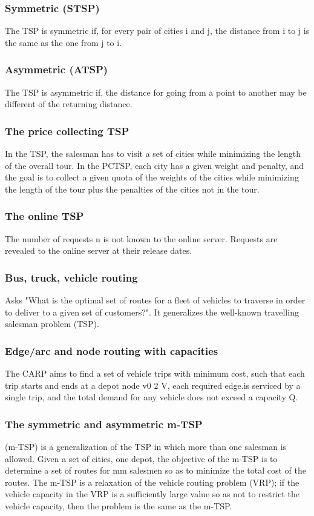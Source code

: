 \documentclass[12pt]{article}
\begin{document}
\subsubsection{ Symmetric (STSP) }
The TSP is symmetric if, for every pair of cities i and j, the distance from i to j is the same as the one from j to i.

\subsubsection{ Asymmetric (ATSP) }
The TSP is asymmetric if, the distance for going from a point to another may be different of the returning distance.

\subsubsection{ The price collecting TSP }
In the TSP, the salesman has to visit a set of cities while minimizing the length of the overall tour. In the PCTSP, each city has a given weight and penalty, and the goal is to collect a given quota of the weights of the cities while minimizing the length of the tour plus the penalties of the cities not in the tour.

\subsubsection{ The online TSP }
The number of requests n is not known to the online server. Requests are revealed to the online server at their release dates.

\subsubsection{ Bus, truck, vehicle routing }
Asks "What is the optimal set of routes for a fleet of vehicles to traverse in order to deliver to a given set of customers?". It generalizes the well-known travelling salesman problem (TSP).

\subsubsection{ Edge/arc and node routing with capacities }
The CARP aims to find a set of vehicle trips with minimum cost, such that each trip starts and ends at a depot node v0 2 V, each required edge.is serviced by a single trip, and the total demand for any vehicle does not exceed a capacity Q.

\subsubsection{  The symmetric and asymmetric m-TSP }
(m-TSP) is a generalization of the TSP in which more than one salesman is allowed. Given a set of cities, one depot, the objective of the m-TSP is to determine a set of routes for mm salesmen so as to minimize the total cost of the routes. The m-TSP is a relaxation of the vehicle routing problem (VRP); if the vehicle capacity in the VRP is a sufficiently large value so as not to restrict the vehicle capacity, then the problem is the same as the m-TSP.
\end{document}
